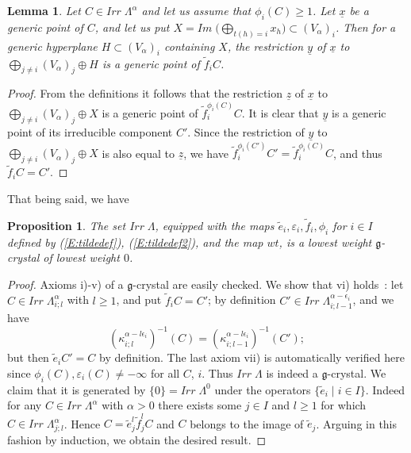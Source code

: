 \documentclass[a4paper,10pt]{amsart}
\def\a{\alpha}
\def\g{\mathfrak{g}}
\newtheorem{lem}[theo]{Lemma}
\newtheorem{prop}[theo]{Proposition}
\numberwithin{equation}{section}
\begin{document}
\begin{lem}\label{L:KSproof}
Let $C \in Irr\;\Lambda^{\a}$ and let us assume that $\phi_i(C) \geq 1$. Let $\underline{x}$ be a generic point of $C$, and let us put $X= Im\;\big( \bigoplus_{t(h)=i} x_h \big) \subset (V_{\a})_i$. Then for a generic hyperplane $H \subset (V_{\a})_i$ containing $X$, the restriction $\underline{y}$ of $\underline{x}$ to $\bigoplus_{j \neq i} (V_{\a})_j \oplus H$ is a generic point of $\tilde{f}_iC$.
\end{lem}
\begin{proof} From the definitions it follows that the restriction $\underline{z}$ of $\underline{x}$ to $\bigoplus_{j \neq i} (V_{\a})_j \oplus X$ is a generic point of $\tilde{f}_i^{\phi_i(C)}C$. It is clear that $\underline{y}$ is a generic point of its irreducible component $C'$. Since the restriction of $\underline{y}$ to $\bigoplus_{j \neq i} (V_{\a})_j \oplus X$ is also equal to $\underline{z}$, we have $\tilde{f}_i^{\phi_i(C')}C'=\tilde{f}_i^{\phi_i(C)}C$, and thus
$\tilde{f}_iC=C'$.\end{proof}

\vspace{.1in}

That being said, we have

\vspace{.1in}

\begin{prop}\label{P:KSstep0} The set $Irr\;\Lambda$, equipped with the maps $\tilde{e}_i, \varepsilon_i, \tilde{f}_i, \phi_i$ for $i \in I$ defined by (\ref{E:tildedef}), (\ref{E:tildedef2}), and the map $wt$, is a lowest weight $\g$-crystal of lowest weight $0$.
\end{prop}
\begin{proof} Axioms i)-v) of a $\g$-crystal are easily checked. We show that vi) holds~: let $C \in Irr\;\Lambda^{\a}_{i;l}$ with $l \geq 1$, and put $\tilde{f}_iC=C'$; by definition $C' \in Irr\;\Lambda^{\a-\epsilon_i}_{i;l-1}$, and we have
$$(\kappa^{\a-l\epsilon_i}_{i;l})^{-1}(C)=(\kappa^{\a-l\epsilon_i}_{i;l-1})^{-1}(C');$$
but then $\tilde{e}_iC'=C$ by definition. The last axiom vii) is automatically verified here since $\phi_i(C), \varepsilon_i(C) \neq -\infty$ for all $C$, $i$. Thus $Irr\;\Lambda$ is indeed a $\g$-crystal. We claim that it is generated by $\{0\} = Irr\; \Lambda^{0}$ under the operators $\{\tilde{e}_i\;|\; i \in I\}$. Indeed for any $C \in Irr\;\Lambda^{\a}$ with $\a >0$ there exists some $j \in I$ and $l \geq 1$ for which $C \in Irr\;\Lambda^{\a}_{j;l}$. Hence 
$C=\tilde{e}_j^{l} \tilde{f}_j^l C$ and $C$ belongs to the image of $\tilde{e}_j$. Arguing in this fashion by induction, we obtain the desired result. \end{proof}
\end{document}
